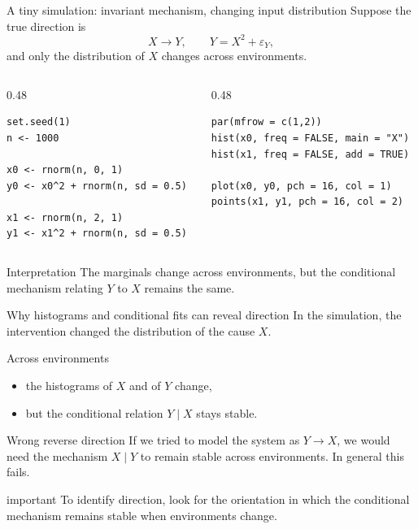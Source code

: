 \documentclass[dvipsnames,aspectratio=169,handout]{beamer}
\begin{document}
\begin{frame}[fragile]{A tiny simulation: invariant mechanism, changing input distribution}
Suppose the true direction is
\[
X \to Y,
\qquad
Y = X^2 + \varepsilon_Y,
\]
and only the distribution of $X$ changes across environments.

\begin{columns}[T,onlytextwidth]
\begin{column}{0.48\textwidth}
\begin{lstlisting}
set.seed(1)
n <- 1000

x0 <- rnorm(n, 0, 1)
y0 <- x0^2 + rnorm(n, sd = 0.5)

x1 <- rnorm(n, 2, 1)
y1 <- x1^2 + rnorm(n, sd = 0.5)
\end{lstlisting}
\end{column}
\begin{column}{0.48\textwidth}
\begin{lstlisting}
par(mfrow = c(1,2))
hist(x0, freq = FALSE, main = "X")
hist(x1, freq = FALSE, add = TRUE)

plot(x0, y0, pch = 16, col = 1)
points(x1, y1, pch = 16, col = 2)
\end{lstlisting}
\end{column}
\end{columns}

\begin{alertblock}{Interpretation}
The marginals change across environments, but the conditional mechanism relating $Y$ to $X$ remains the same.
\end{alertblock}
\end{frame}

\begin{frame}{Why histograms and conditional fits can reveal direction}
In the simulation, the intervention changed the distribution of the cause $X$.

\begin{block}{Across environments}
\begin{itemize}
    \item the histograms of $X$ and of $Y$ change,
    \item but the conditional relation $Y\mid X$ stays stable.
\end{itemize}
\end{block}

\begin{alertblock}{Wrong reverse direction}
If we tried to model the system as
$
Y \to X$, we would need the mechanism $X\mid Y$ to remain stable across environments.
In general this fails.
\end{alertblock}

\begin{beamercolorbox}[wd=\textwidth,sep=7pt,center,rounded=true,shadow=true]{important}
To identify direction, look for the orientation in which the conditional mechanism remains stable when environments change.
\end{beamercolorbox}
\end{frame}
\end{document}
